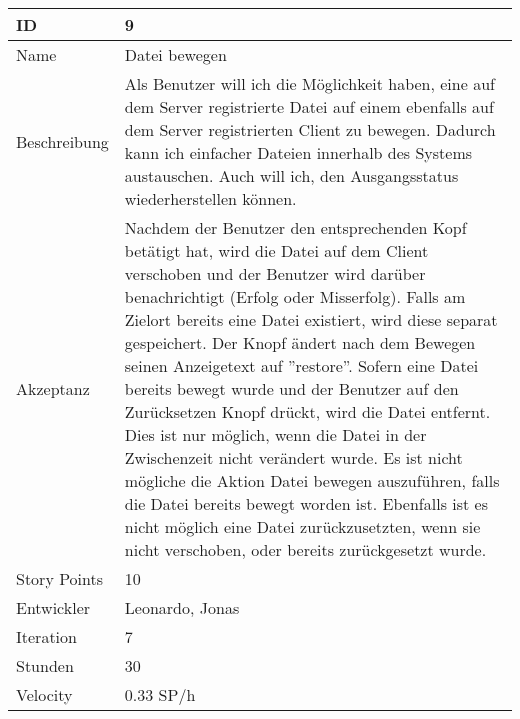 \begin{table}[htbp]
    \begin{minipage}{\linewidth}
        \setlength{\tymax}{0.5\linewidth}
        \centering
        \small
        \begin{tabulary}{\textwidth}{|l|p{10cm}|} \hline
            ID   &9\\\hline
            Name  &Datei bewegen\\\hline
            Beschreibung&Als Benutzer will ich die Möglichkeit haben, eine auf dem Server registrierte Datei auf einem ebenfalls auf dem Server registrierten Client zu bewegen.
            Dadurch kann ich einfacher Dateien innerhalb des Systems austauschen. Auch will ich, den Ausgangsstatus wiederherstellen können.\\\hline
            Akzeptanz &Nachdem der Benutzer den entsprechenden Kopf betätigt hat, wird die Datei auf dem Client verschoben und der Benutzer wird darüber benachrichtigt (Erfolg oder Misserfolg). Falls am Zielort bereits eine Datei existiert, wird diese separat gespeichert. Der Knopf ändert nach dem Bewegen seinen Anzeigetext auf ''restore''. Sofern eine Datei bereits bewegt wurde und der Benutzer auf den Zurücksetzen Knopf drückt, wird die Datei entfernt. Dies ist nur möglich, wenn die Datei in der Zwischenzeit nicht verändert wurde. Es ist nicht mögliche die Aktion Datei bewegen auszuführen, falls die Datei bereits bewegt worden ist. Ebenfalls ist es nicht möglich eine Datei zurückzusetzten, wenn sie nicht verschoben, oder bereits zurückgesetzt wurde.\\\hline
            Story Points&10\\\hline
            Entwickler &Leonardo, Jonas\\\hline
            Iteration &7\\\hline
            Stunden  &30\\\hline
            Velocity &0.33 SP\slash h\\\hline
        \end{tabulary}
    \end{minipage}
\end{table}



